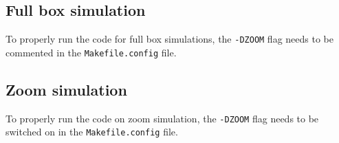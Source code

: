 \documentclass{article}
\begin{document}
\subsection{Full box simulation}
To properly run the code for full box simulations, the \texttt{-DZOOM} flag needs to be commented in the \texttt{Makefile.config} file.

\subsection{Zoom simulation}
To properly run the code on zoom simulation, the \texttt{-DZOOM} flag needs to be switched on in the \texttt{Makefile.config} file.
\end{document}
